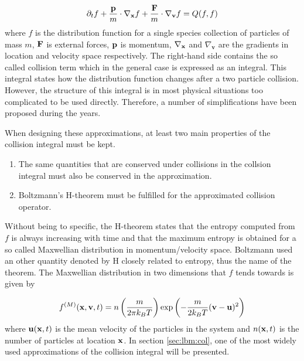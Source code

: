 \begin{equation}\label{eq:lbm:boltzmann-eq}
\partial_t f + \frac{\mathbf{p}}{m} \cdot \nabla_{\mathbf{x}}f + \frac{\mathbf{F}}{m} \cdot
\nabla_{\mathbf{v}}f = Q(f, f)
\end{equation}
where $f$ is the distribution function for a single species collection
of particles of mass $m$, $\mathbf{F}$ is external forces, $\mathbf{p}$ is momentum,
$\nabla_{\mathbf{x}}$ and $\nabla_{\mathbf{v}}$ are the gradients in location
and velocity space respectively. The right-hand side contains the so
called collision term which in the general case is expressed as an
integral. This integral states how the distribution function changes
after a two particle collision. However, the structure of this
integral is in most physical situations too complicated to be used
directly. Therefore, a number of simplifications have been proposed
during the years.

When designing these approximations, at least two main properties of
the collision integral must be kept. \cite{wolf-gladrow}

\begin{enumerate}
  \item The same quantities that are conserved under collisions in the
    collsion integral must also be conserved in the approximation.
  \item Boltzmann's H-theorem must be fulfilled for the
    approximated collision operator.
\end{enumerate}

Without being to specific, the H-theorem states that the entropy
computed from $f$ is always increasing with time and that the maximum
entropy is obtained for a so called Maxwellian distribution in
momentum/velocity space. Boltzmann used an other quantity denoted by H
closely related to entropy, thus the name of the theorem. The
Maxwellian distribution in two dimensions that $f$ tends towards is
given by

\begin{equation}\label{eq:lbm:maxwell}
f^{(M)}(\mathbf{x}, \mathbf{v}, t) = n \left ( \frac{m}{2 \pi k_B T} \right )
\exp{\left( -\frac{m}{2 k_B T} (\mathbf{v} - \ensuremath{\mathbf{u}})^2\right)}
\end{equation} 
where $\mathbf{u}(\mathbf{x}, t)$ is the mean velocity of the particles in the system and
$n(\mathbf{x}, t)$ is the number of particles at location $\mathbf{x}$. In section
\ref{sec:lbm:col}, one of the most widely used approximations of the
collision integral will be presented.
